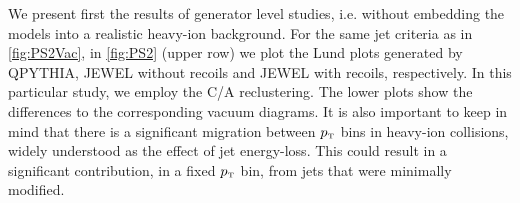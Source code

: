 
We present first the results of generator level studies, i.e. without embedding the models into a realistic heavy-ion background.
For the same jet criteria as in \autoref{fig:PS2Vac}, in \autoref{fig:PS2} (upper row) we plot the Lund plots generated by QPYTHIA, JEWEL without recoils and JEWEL with recoils, respectively. 
In this particular study, we employ the C/A reclustering. 
The lower plots show the differences to the corresponding vacuum diagrams. 
It is also important to keep in mind that there is a significant migration between $p_{\text{\tiny T}}$ bins in heavy-ion collisions, widely understood as the effect of jet energy-loss. This could result in a significant contribution, in a fixed $p_{\text{\tiny T}}$ bin, from jets that were minimally modified.


